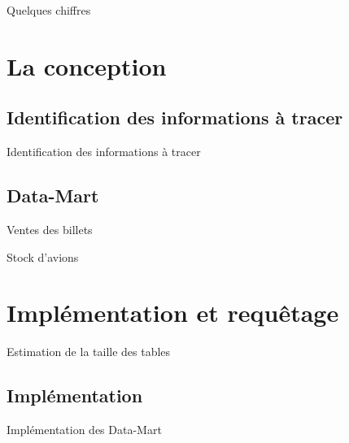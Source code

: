 \documentclass[10pt,handout]{beamer}
\begin{document}
\begin{frame}{Quelques chiffres}
    
\end{frame}



\section{La conception}

\subsection{Identification des informations à tracer}
\begin{frame}{Identification des informations à tracer}
  
\end{frame}

\subsection{Data-Mart}

\begin{frame}{Ventes des billets}

\end{frame}

\begin{frame}{Stock d'avions}
    
\end{frame}

\section{Implémentation et requêtage}

\begin{frame}{Estimation de la taille des tables}
    
\end{frame}

\subsection{Implémentation}

\begin{frame}{Implémentation des Data-Mart}

\end{frame}
\end{document}
